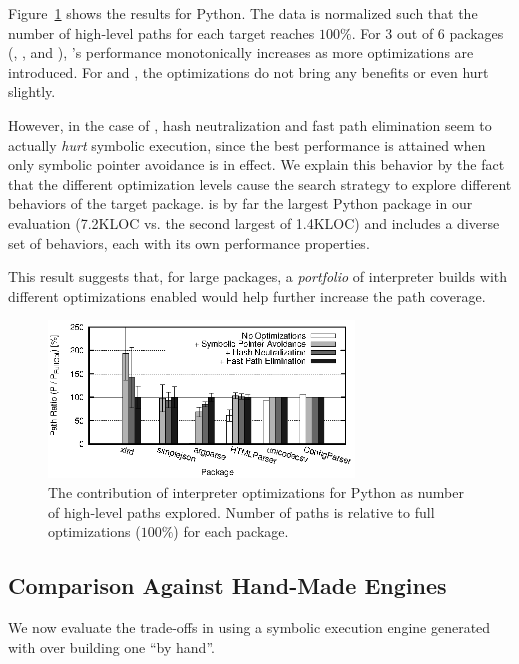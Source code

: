 Figure~\ref{fig:optimizations} shows the results for Python.  The data is normalized such that the number of high-level paths for each target reaches $100\%$.  For 3 out of 6 packages (, , and ), \chef's performance monotonically increases as more optimizations are introduced.  For  and , the optimizations do not bring any benefits or even hurt slightly.  

However, in the case of , hash neutralization and fast path elimination seem to actually \emph{hurt} symbolic execution, since the best performance is attained when only symbolic pointer avoidance is in effect.  We explain this behavior by the fact that the different optimization levels cause the search strategy to explore different behaviors of the target package.   is by far the largest Python package in our evaluation (7.2KLOC vs. the second largest of 1.4KLOC) and includes a diverse set of behaviors, each with its own performance properties.

This result suggests that, for large packages, a \emph{portfolio} of interpreter builds with different optimizations enabled would help further increase the path coverage.

\begin{figure}
  \centering
  \includegraphics[width=3.2in]{figures/evaluation/optimizations-bars-python}
  \caption{The contribution of interpreter optimizations for Python as number of high-level paths explored.  Number of paths is relative to full optimizations ($100\%$) for each package.}
  \label{fig:optimizations}
\end{figure}


\subsection{Comparison Against Hand-Made Engines}
\label{sec:sub:comparison}

We now evaluate the trade-offs in using a symbolic execution engine generated with \chef over building one ``by hand''.


